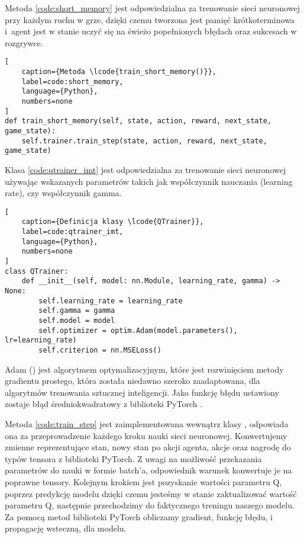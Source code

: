 Metoda  \ref{code:short_memory} jest odpowiedzialna za trenowanie sieci neuronowej przy każdym ruchu w grze, dzięki czemu tworzona jest pamięć krótkoterminowa i~agent jest w stanie uczyć się na świeżo popełnionych błędach oraz sukcesach w rozgrywce.

\begin{onepage}
    \begin{lstlisting}[
    caption={Metoda \lcode{train_short_memory()}},
    label=code:short_memory,
    language={Python},
    numbers=none
]
def train_short_memory(self, state, action, reward, next_state, game_state):
    self.trainer.train_step(state, action, reward, next_state, game_state)

    \end{lstlisting}
\end{onepage}

Klasa  \ref{code:qtrainer_imt} jest odpowiedzialna za trenowanie sieci neuronowej używając wskazanych parametrów takich jak współczynnik nauczania (learning rate), czy współczynnik gamma.

\begin{onepage}
    \begin{lstlisting}[
    caption={Definicja klasy \lcode{QTrainer}},
    label=code:qtrainer_imt,
    language={Python},
    numbers=none
]
class QTrainer:
    def __init__(self, model: nn.Module, learning_rate, gamma) -> None:
        self.learning_rate = learning_rate
        self.gamma = gamma
        self.model = model
        self.optimizer = optim.Adam(model.parameters(), lr=learning_rate)
        self.criterion = nn.MSELoss()
    \end{lstlisting}
\end{onepage}


Adam () \cite{AdamOpt1} \cite{AdamOpt2} jest algorytmem optymalizacyjnym, które jest rozwinięciem metody gradientu prostego, która została niedawno szeroko zaadaptowana, dla algorytmów trenowania sztucznej inteligencji. Jako funkcję błędu ustawiony zostaje błąd średniokwadratowy z biblioteki PyTorch .

\clearpage

Metoda  \ref{code:train_step} jest zaimplementowana wewnątrz klasy , odpowiada ona za przeprowadzenie każdego kroku nauki sieci neuronowej. Konwertujemy zmienne reprezentujące stan, nowy stan po akcji agenta, akcje oraz nagrodę do typów tensora z biblioteki PyTorch. Z uwagi na możliwość przekazania parametrów do nauki w formie batch'a, odpowiednik warunek konwertuje je na poprawne tensory. Kolejnym krokiem jest pozyskanie wartości parametru Q, poprzez predykcję modelu dzięki czemu jesteśmy w stanie zaktualizować wartość parametru Q, następnie przechodzimy do faktycznego treningu naszego modelu. Za pomocą metod biblioteki PyTorch obliczamy gradient, funkcję błędu, i propagację wsteczną, dla modelu.

